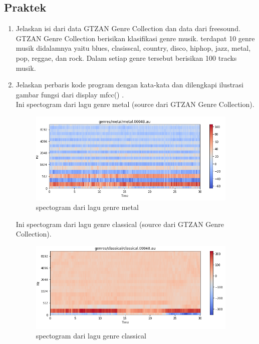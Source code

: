 \subsection{Praktek}
\begin{enumerate}


\item Jelaskan isi dari data GTZAN Genre Collection dan data dari freesound.
	\hfill\\
	 GTZAN Genre Collection berisikan klasiﬁkasi genre musik. terdapat 10 genre musik didalamnya yaitu blues, clasisscal, country, disco, hiphop, jazz, metal, pop, reggae, dan rock. Dalam setiap genre tersebut berisikan 100 tracks musik.
	
	 

\item Jelaskan perbaris kode program dengan kata-kata dan dilengkapi ilustrasi gambar fungsi dari display mfcc() .
	\hfill\\

Ini spectogram dari lagu genre metal (source dari GTZAN Genre Collection).

\begin{figure}[H]
	\centering
	\includegraphics[width=10cm]{figures/1174084/6/1.png}
	\caption{spectogram dari lagu genre metal}
\end{figure}

Ini spectogram dari lagu genre classical (source dari GTZAN Genre Collection).

\begin{figure}[H]
	\centering
	\includegraphics[width=10cm]{figures/1174084/6/2.png}
	\caption{spectogram dari lagu genre classical}
\end{figure}


\end{enumerate}
